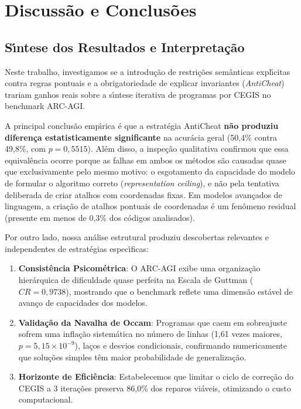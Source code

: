 \section{Discuss\~{a}o e Conclus\~{o}es}
\label{sec:conclusao}

\subsection{S\'{\i}ntese dos Resultados e Interpreta\c{c}\~{a}o}

Neste trabalho, investigamos se a introdu\c{c}\~{a}o de restri\c{c}\~{o}es sem\^{a}nticas expl\'{\i}citas contra regras pontuais e a obrigatoriedade de explicar invariantes (\textit{AntiCheat}) trariam ganhos reais sobre a s\'{\i}ntese iterativa de programas por CEGIS no benchmark ARC-AGI.

A principal conclus\~{a}o emp\'{\i}rica \'{e} que a estrat\'{e}gia AntiCheat \textbf{n\~{a}o produziu diferen\c{c}a estatisticamente significante} na acur\'{a}cia geral (50,4\% contra 49,8\%, com $p = 0,5515$). Al\'{e}m disso, a inspe\c{c}\~{a}o qualitativa confirmou que essa equival\^{e}ncia ocorre porque as falhas em ambos os m\'{e}todos s\~{a}o causadas quase que exclusivamente pelo mesmo motivo: o esgotamento da capacidade do modelo de formular o algoritmo correto (\textit{representation ceiling}), e n\~{a}o pela tentativa deliberada de criar atalhos com coordenadas fixas. Em modelos avan\c{c}ados de linguagem, a cria\c{c}\~{a}o de atalhos pontuais de coordenadas \'{e} um fen\^{o}meno residual (presente em menos de 0,3\% dos c\'{o}digos analisados).

Por outro lado, nossa an\'{a}lise estrutural produziu descobertas relevantes e independentes de estrat\'{e}gias espec\'{\i}ficas:
\begin{enumerate}
    \item \textbf{Consist\^{e}ncia Psicom\'{e}trica}: O ARC-AGI exibe uma organiza\c{c}\~{a}o hier\'{a}rquica de dificuldade quase perfeita na Escala de Guttman ($CR = 0,9738$), mostrando que o benchmark reflete uma dimens\~{a}o est\'{a}vel de avan\c{c}o de capacidades dos modelos.
    \item \textbf{Valida\c{c}\~{a}o da Navalha de Occam}: Programas que caem em sobreajuste sofrem uma infla\c{c}\~{a}o sistem\'{a}tica no n\'{u}mero de linhas (1,61 vezes maiores, $p = 5,15 \times 10^{-9}$), la\c{c}os e desvios condicionais, confirmando numericamente que solu\c{c}\~{o}es simples t\^{e}m maior probabilidade de generaliza\c{c}\~{a}o.
    \item \textbf{Horizonte de Efici\^{e}ncia}: Estabelecemos que limitar o ciclo de corre\c{c}\~{a}o do CEGIS a 3 itera\c{c}\~{o}es preserva 86,0\% dos reparos vi\'{a}veis, otimizando o custo computacional.
\end{enumerate}

